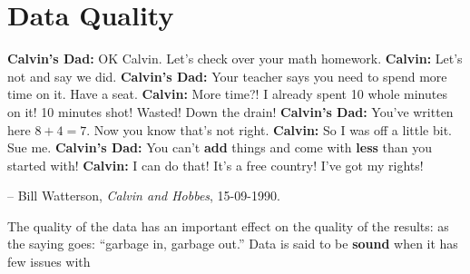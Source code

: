 \section{Data Quality}
\begin{tcolorbox}[title=The Importance of Validation]
\textbf{Calvin's Dad:} OK Calvin. Let's check over your math homework. \newline
\textbf{Calvin:} Let's not and say we did. \newline
\textbf{Calvin's Dad:} Your teacher says you need to spend more time on it. Have a seat. \newline
\textbf{Calvin:} More time?! I already spent 10 whole minutes on it! 10 minutes shot! Wasted! Down the drain!\newline
\textbf{Calvin's Dad:} You've written here $8+4=7$. Now you know that's not right. \newline
\textbf{Calvin:} So I was off a little bit. Sue me.\newline
\textbf{Calvin's Dad:} You can't \textbf{add} things and come with \textbf{less} than you started with!\newline
\textbf{Calvin:} I can do that! It's a free country! I've got my rights!
\\[-0.6cm]
\begin{flushright}
-- Bill Watterson, \textit{Calvin and Hobbes}, 15-09-1990.
\end{flushright}
\end{tcolorbox}
\noindent
The quality of the data has an important effect on the quality of the results: as the saying goes: ``garbage in, garbage out.''
\newl Data is said to be \textbf{sound} when it has few issues  with 
